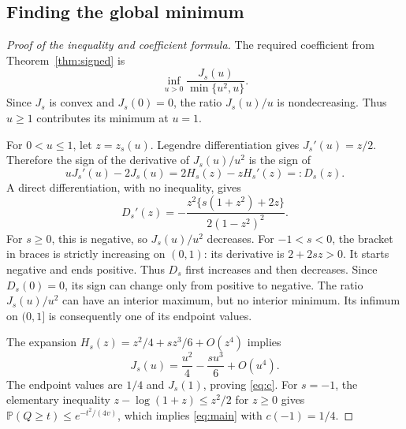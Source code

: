 \documentclass[11pt,letterpaper]{article}
\numberwithin{equation}{section}
\theoremstyle{definition}\newtheorem{definition}[theorem]{Definition}
\theoremstyle{remark}\newtheorem{remark}[theorem]{Remark}
\newcommand{\PP}{\mathbb P}
\begin{document}
\subsection{Finding the global minimum}
\begin{proof}[Proof of the inequality and coefficient formula]
The required coefficient from Theorem~\ref{thm:signed} is
\[
 \inf_{u>0}\frac{J_s(u)}{\min\{u^2,u\}}.
\]
Since $J_s$ is convex and $J_s(0)=0$, the ratio $J_s(u)/u$ is
nondecreasing. Thus $u\ge1$ contributes its minimum at $u=1$.

For $0<u\le1$, let $z=z_s(u)$. Legendre differentiation gives
$J_s'(u)=z/2$. Therefore the sign of the derivative of $J_s(u)/u^2$
is the sign of
\begin{equation}\label{eq:D}
 uJ_s'(u)-2J_s(u)=2H_s(z)-zH_s'(z)=:D_s(z).
\end{equation}
A direct differentiation, with no inequality, gives
\begin{equation}\label{eq:Dprime}
 D_s'(z)=-\frac{z^2\{s(1+z^2)+2z\}}{2(1-z^2)^2}.
\end{equation}
For $s\ge0$, this is negative, so $J_s(u)/u^2$ decreases. For
$-1<s<0$, the bracket in braces is strictly increasing on $(0,1)$:
its derivative is $2+2sz>0$. It starts negative and ends positive.
Thus $D_s$ first increases and then decreases. Since $D_s(0)=0$,
its sign can change only from positive to negative. The ratio
$J_s(u)/u^2$ can have an interior maximum, but no interior minimum.
Its infimum on $(0,1]$ is consequently one of its endpoint values.

The expansion $H_s(z)=z^2/4+sz^3/6+O(z^4)$ implies
\begin{equation}\label{eq:smallrate}
 J_s(u)=\frac{u^2}{4}-\frac{s u^3}{6}+O(u^4).
\end{equation}
The endpoint values are $1/4$ and $J_s(1)$, proving \eqref{eq:c}.
For $s=-1$, the elementary inequality
$z-\log(1+z)\le z^2/2$ for $z\ge0$ gives
\(\PP(Q\ge t)\le e^{-t^2/(4v)}\), which implies
\eqref{eq:main} with $c(-1)=1/4$.
\end{proof}
\end{document}
